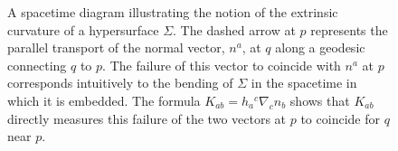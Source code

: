 \begingroup
\renewcommand{\thefigure}{10.3}
\begin{figure}[htbp]
\centering
{}
\caption{A spacetime diagram illustrating the notion of the extrinsic curvature
of a hypersurface \(\Sigma\). The dashed arrow at \(p\) represents the parallel
transport of the normal vector, \(n^a\), at \(q\) along a geodesic connecting
\(q\) to \(p\). The failure of this vector to coincide with \(n^a\) at \(p\)
corresponds intuitively to the bending of \(\Sigma\) in the spacetime in which it
is embedded. The formula \(K_{ab}=h_a{}^c\nabla_cn_b\) shows that \(K_{ab}\)
directly measures this failure of the two vectors at \(p\) to coincide for \(q\)
near \(p\).}
\label{fig:10.3}
\end{figure}
\endgroup
